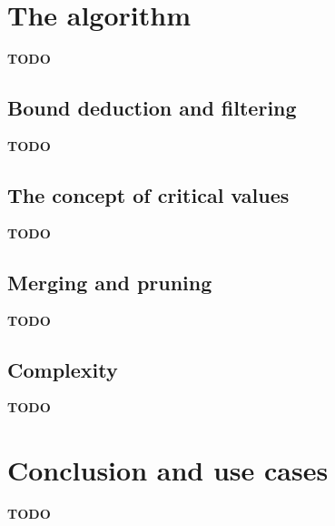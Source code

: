 \documentclass[a4paper,10pt]{article}
\begin{document}
\section{The algorithm}
\textbf{TODO}
\subsection{Bound deduction and filtering}
\textbf{TODO}
\subsection{The concept of critical values}
\textbf{TODO}
\subsection{Merging and pruning}
\textbf{TODO}
\subsection{Complexity}
\textbf{TODO}

\section{Conclusion and use cases}
\textbf{TODO}
\end{document}
